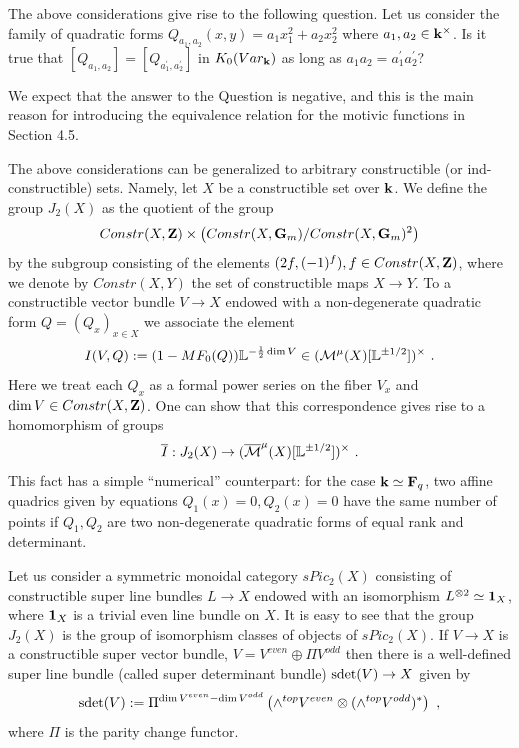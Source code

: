 \documentclass[12pt]{article}
\begin{document}
\begin{que}
The above considerations give rise to the following question. Let us consider the family of quadratic forms
$Q_{a_1,a_2}(x,y)=a_1x_1^2+a_2x_2^2$ where $a_1,a_2\in {\bf k}^{\times}$. Is it true that
$[Q_{a_1,a_2}]=[Q_{a_1^{\prime},a_2^{\prime}}]$ in $K_0(Var_{{\bf k}})$ as long as $a_1a_2=a_1^{\prime}a_2^{\prime}$?

\end{que}

We expect that the answer to the Question is negative, and this is the main reason for introducing the equivalence relation for the motivic functions in Section 4.5.


The above considerations can be generalized to arbitrary constructible (or ind-constructible) sets. Namely, let $X$ be a constructible set over ${\bf k}$.  We define the group $J_2(X)$ as the quotient of the group 
$$Constr(X,{\bf Z})\times \bigl(Constr(X,{\bf G}_m)/Constr(X,{\bf G}_m)^2\bigr)$$
 by the subgroup consisting of the elements $(2f,(-1)^f), f\in Constr(X,{\bf Z})$, where we denote
by $Constr(X,Y)$  the set of constructible maps $X\to Y$. To a constructible vector bundle $V\to X$ endowed with a non-degenerate quadratic form $Q=(Q_x)_{x\in X}$ we associate the element 
$${I}(V,Q):=(1-MF_0(Q)){\mathbb L}^{-{1\over{2}}\dim V}\in ({\cal M}^{\mu}(X)[{\mathbb L}^{\pm 1/2}])^{\times}\,\,.$$ Here we treat each $Q_x$ as a formal power series on the fiber $V_x$ and $\dim V\in Constr(X,{\bf Z})$. One can show that this correspondence gives rise to a homomorphism of groups 
$$\overline{I}: J_2(X)\to (\overline{{\cal M}}^{\mu}(X)[{\mathbb L}^{\pm 1/2}])^{\times}\,\,.$$ 
This fact has a simple ``numerical'' counterpart: for the case ${\bf k}\simeq {\mathbf F}_q$, 
two affine quadrics given by equations $Q_1(x)=0, Q_2(x)=0$ have the same number of points if $Q_1,Q_2$ are two 
non-degenerate quadratic forms
 of equal rank and determinant.

Let us consider a symmetric monoidal category $sPic_2(X)$ consisting of constructible super line bundles $L\to X$ endowed with an isomorphism $L^{\otimes 2}\simeq {\bf 1}_X$, where ${\bf 1}_X$ is a trivial even line bundle on $X$. It is easy to see that the group $J_2(X)$ is the group of isomorphism classes of objects of
$sPic_2(X)$.
If $V\to X$ is a constructible super vector bundle, $V=V^{even}\oplus \Pi V^{odd}$ then there is a well-defined super line bundle (called super determinant bundle) $\operatorname{sdet}(V)\to X$ given by 
$$\operatorname{sdet}(V):=\Pi^{\dim V^{even}-\dim V^{odd}}\left(\wedge^{top}V^{even}\otimes (\wedge^{top}V^{odd})^{\ast}\right)\,\,,$$ where
$\Pi$ is the parity change functor.
\end{document}
